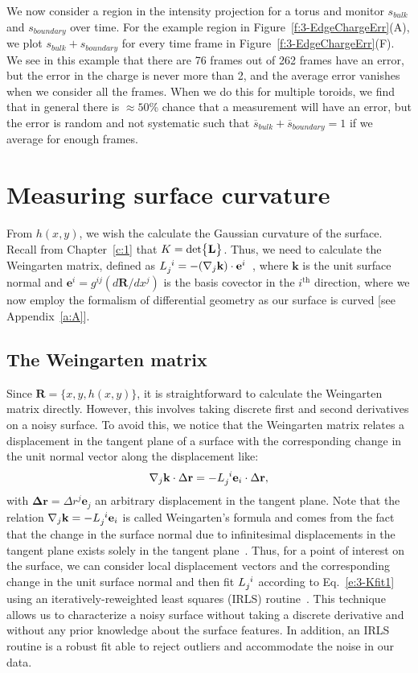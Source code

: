 We now consider a region in the intensity projection for a torus and monitor  $s_{bulk}$ and $s_{boundary}$ over time.
For the example region in Figure~\ref{f:3-EdgeChargeErr}(A), we plot $s_{bulk}+s_{boundary}$ for every time frame in Figure~\ref{f:3-EdgeChargeErr}(F).
We see in this example that there are 76 frames out of 262 frames have an error, but the error in the charge is never more than 2, and the average error vanishes when we consider all the frames.
When we do this for multiple toroids, we find that in general there is $\approx 50$\% chance that a measurement will have an error, but the error is random and not systematic such that $\overbar{s}_{bulk} + \overbar{s}_{boundary} = 1$ if we average for enough frames.




\section{Measuring surface curvature}
From $h(x,y)$, we wish the calculate the Gaussian curvature of the surface.
Recall from Chapter~\ref{c:1} that $K = \textup{det} \big \{ \mathbf{L} \big \}$.
Thus, we need to calculate the Weingarten matrix, defined as $\tensor{L}{_j^i} = -(\nabla_j \mathbf{k}) \cdot \mathbf{e}^i$~\cite{RN35}, where $\mathbf{k}$ is the unit surface normal and $\mathbf{e}^i = g^{ij}(d \mathbf{R}/dx^j)$ is the basis covector in the $i^{\textrm{th}}$ direction, where we now employ the formalism of differential geometry as our surface is curved [see Appendix~\ref{a:A}].


\subsection{The Weingarten matrix}
Since $\mathbf{R} = \{x, y, h(x,y)\}$, it is straightforward to calculate the Weingarten matrix directly.
However, this involves taking discrete first and second derivatives on a noisy surface.
To avoid this, we notice that the Weingarten matrix relates a displacement in the tangent plane of a surface with the corresponding change in the unit normal vector along the displacement like:
\begin{equation}
\nabla_j \mathbf{k} \cdot \Delta \mathbf{r} = -\tensor{L}{_j^i} \mathbf{e}_i \cdot \Delta \mathbf{r},\label{e:3-Kfit1}
\end{equation}
with $\mathbf{\Delta r} = \Delta r^j \mathbf{e}_j$ an arbitrary displacement in the tangent plane.
Note that the relation $\nabla_j \mathbf{k} = -\tensor{L}{_j^i} \mathbf{e}_i$ is called Weingarten's formula and comes from the fact that the change in the surface normal due to infinitesimal displacements in the tangent plane exists solely in the tangent plane~\cite{RN35}.
Thus, for a point of interest on the surface, we can consider local displacement vectors and the corresponding change in the unit surface normal and then fit $\tensor{L}{_j^i}$ according to Eq.~\ref{e:3-Kfit1} using an iteratively-reweighted least squares (IRLS) routine~\cite{RN32,RN31}.
This technique allows us to characterize a noisy surface without taking a discrete derivative and without any prior knowledge about the surface features.
In addition, an IRLS routine is a robust fit able to reject outliers and accommodate the noise in our data.


